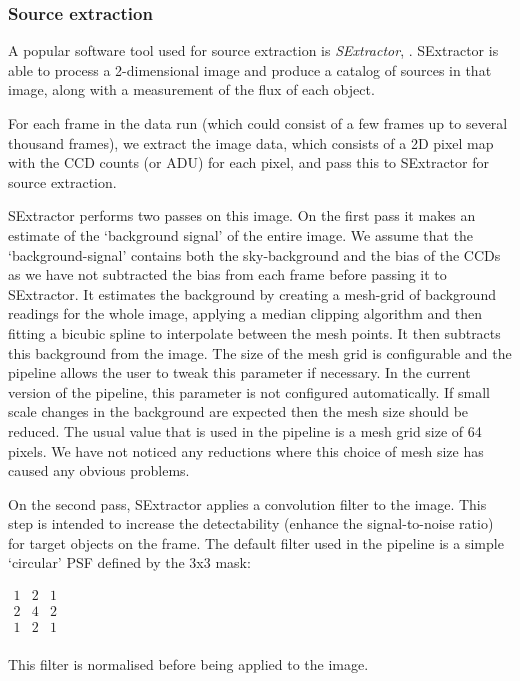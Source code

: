 \subsubsection{Source extraction}
A popular software tool used for source extraction is \emph{SExtractor}, \citep{bertin}. SExtractor is able to process a 2-dimensional image and produce a catalog of sources in that image, along with a measurement of the flux of each object. 

For each frame in the data run (which could consist of a few frames up to several thousand frames), we extract the image data, which consists of a 2D pixel map with the CCD counts (or ADU) for each pixel, and pass this to SExtractor for source extraction. 

SExtractor performs two passes on this image. On the first pass it makes an estimate of the `background signal' of the entire image. We assume that the `background-signal' contains both the sky-background and the bias of the CCDs as we have not subtracted the bias from each frame before passing it to SExtractor. It estimates the background by creating a mesh-grid of background readings for the whole image, applying a median clipping algorithm and then fitting a bicubic spline to interpolate between the mesh points. It then subtracts this background from the image. The size of the mesh grid is configurable and the pipeline allows the user to tweak this parameter if necessary. In the current version of the pipeline, this parameter is not configured automatically.  If small scale changes in the background are expected then the mesh size should be reduced. The usual value that is used in the pipeline is a mesh grid size of 64 pixels. We have not noticed any reductions where this choice of mesh size has caused any obvious problems. 

On the second pass, SExtractor applies a convolution filter to the image. This step is intended to increase the detectability (enhance the signal-to-noise ratio) for target objects on the frame. The default filter used in the pipeline is a simple `circular' PSF defined by the 3x3 mask:

$
\begin{array}{ccc}
  1 & 2 & 1 \\
  2 & 4 & 2 \\
  1 & 2 & 1 \\
\end{array}  
$

This filter is normalised before being applied to the image.

